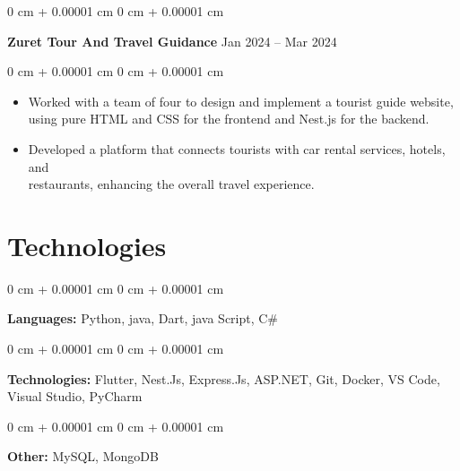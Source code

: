 \documentclass[10pt, letterpaper]{article}
\newenvironment{highlights}{
    \begin{itemize}[
        topsep=0.10 cm,
        parsep=0.10 cm,
        partopsep=0pt,
        itemsep=0pt,
        leftmargin=0 cm + 10pt
    ]
}{
    \end{itemize}
} %
\newenvironment{onecolentry}{
    \begin{adjustwidth}{
        0 cm + 0.00001 cm
    }{
        0 cm + 0.00001 cm
    }
}{
    \end{adjustwidth}
} %
\newenvironment{twocolentry}[2][]{
    \onecolentry
    \def\secondColumn{#2}
    \setcolumnwidth{\fill, 4.5 cm}
    \begin{paracol}{2}
}{
    \switchcolumn \raggedleft \secondColumn
    \end{paracol}
    \endonecolentry
} %
\begin{document}
        \vspace{0.2 cm}

        \begin{twocolentry}{
            Jan 2024 – Mar 2024
        }
            \textbf{Zuret Tour And Travel Guidance}\end{twocolentry}

        \vspace{0.10 cm}
        \begin{onecolentry}
            \begin{highlights}
                \item Worked with a team of four to design and implement a tourist guide website, \\using pure HTML and CSS for the frontend and Nest.js for the backend.
                \item Developed a platform that connects tourists with car rental services, hotels, and \\restaurants, enhancing the overall travel experience.
            \end{highlights}
        \end{onecolentry}

    \section{Technologies} %
        \begin{onecolentry}
            \textbf{Languages:} Python, java, Dart, java Script, C\#
        \end{onecolentry}
        \vspace{0.2 cm}
        \begin{onecolentry}
            \textbf{Technologies:} Flutter, Nest.Js, Express.Js, ASP.NET, Git, Docker, VS Code, Visual Studio, PyCharm
        \end{onecolentry}
        \vspace{0.2 cm}
        \begin{onecolentry}
            \textbf{Other:} MySQL, MongoDB
        \end{onecolentry}
\end{document}
